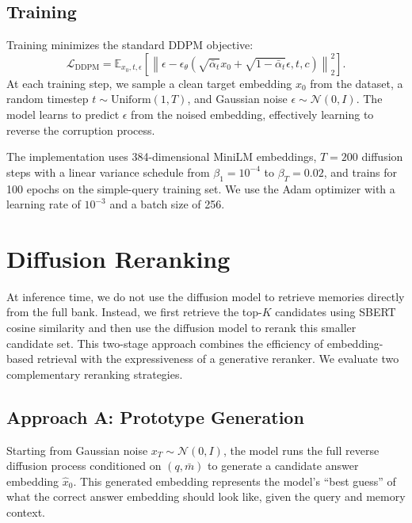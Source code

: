 \documentclass{article}
\begin{document}
\subsection{Training}

Training minimizes the standard DDPM objective:
\begin{equation}
  \mathcal{L}_{\mathrm{DDPM}} =
  \mathbb{E}_{x_0,t,\epsilon}
  \left[
  \left\|\epsilon -
  \epsilon_\theta\left(\sqrt{\bar{\alpha}_t}x_0 +
  \sqrt{1-\bar{\alpha}_t}\epsilon, t, c\right)\right\|_2^2
  \right].
\end{equation}
At each training step, we sample a clean target embedding $x_0$ from the dataset, a random timestep $t \sim \mathrm{Uniform}(1, T)$, and Gaussian noise $\epsilon \sim \mathcal{N}(0, I)$. The model learns to predict $\epsilon$ from the noised embedding, effectively learning to reverse the corruption process.

The implementation uses 384-dimensional MiniLM embeddings, $T=200$ diffusion steps with a linear variance schedule from $\beta_1 = 10^{-4}$ to $\beta_T = 0.02$, and trains for 100 epochs on the simple-query training set. We use the Adam optimizer with a learning rate of $10^{-3}$ and a batch size of 256.

\section{Diffusion Reranking}
\label{sec:reranking}

At inference time, we do not use the diffusion model to retrieve memories directly from the full bank. Instead, we first retrieve the top-$K$ candidates using SBERT cosine similarity and then use the diffusion model to rerank this smaller candidate set. This two-stage approach combines the efficiency of embedding-based retrieval with the expressiveness of a generative reranker. We evaluate two complementary reranking strategies.

\subsection{Approach A: Prototype Generation}

Starting from Gaussian noise $x_T \sim \mathcal{N}(0, I)$, the model runs the full reverse diffusion process conditioned on $(q, \bar{m})$ to generate a candidate answer embedding $\hat{x}_0$. This generated embedding represents the model's ``best guess'' of what the correct answer embedding should look like, given the query and memory context.
\end{document}
